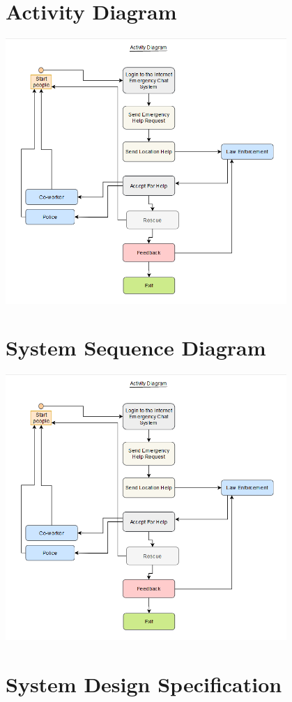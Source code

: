 \documentclass{article}
\begin{document}
\section{Activity Diagram}
\includegraphics[width=0.8\textwidth]{Activity_Diagram.png}


\section{System Sequence Diagram}
\includegraphics[width=0.8\textwidth]{Activity_Diagram.png}


\newpage
\section{System Design Specification}
\end{document}
